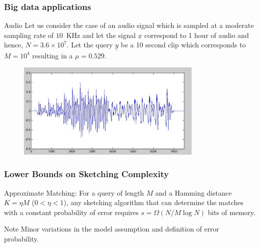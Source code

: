 \documentclass[10pt,xcolor=table]{beamer}
\newcommand{\xv}{\underline{x}}
\newcommand{\yv}{\underline{y}}
\begin{document}
\begin{frame}\frametitle{Big data applications}
\begin{block}{Audio}
Let us consider the case of an audio signal which is sampled at a moderate sampling rate of $10$~KHz and let the signal $\xv$ correspond to 1 hour of audio and hence, $N = 3.6 \times 10^7$. Let the query $\yv$ be a 10 second clip which corresponds to $M = 10^4$ resulting in a $\mu = 0.529$.
\end{block}
\begin{block}{}
\begin{figure}
\includegraphics[width=3.5in]{ScaledVoice.pdf}
\end{figure}
\end{block}
\end{frame}
\begin{frame} \frametitle{Lower Bounds on Sketching Complexity}	
	\begin{block}{Approximate Matching:}
		For a query of length $M$ and a Hamming distance $K= \eta M$ ($0<\eta<1$), any sketching algorithm that can determine the matches with a constant probability of error requires \alert{$s = \Omega (N/M \log N)$} bits of memory.
	\end{block}
	
	\begin{block}{Note}
		 Minor variations in the model assumption and definition of error probability.
	\end{block}
\end{frame}
\end{document}
